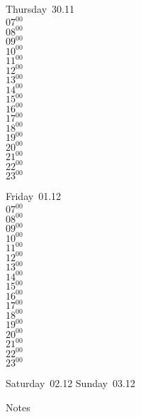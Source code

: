 \documentclass[11pt, a4paper]{book}\usepackage[]{graphicx}\usepackage[]{color}
\begin{document}
\begin{weekdaybox}
  Thursday~30.11\\
  { 
  \vfill
  $07^{00}$\\
$08^{00}$\\
$09^{00}$\\
$10^{00}$\\
$11^{00}$\\
$12^{00}$\\
$13^{00}$\\
$14^{00}$\\
$15^{00}$\\
$16^{00}$\\
$17^{00}$\\
$18^{00}$\\
$19^{00}$\\
$20^{00}$\\
$21^{00}$\\
$22^{00}$\\
$23^{00}$\\
  }
\end{weekdaybox} 
\begin{weekdaybox}
  Friday~01.12\\
  { 
  \vfill
  $07^{00}$\\
$08^{00}$\\
$09^{00}$\\
$10^{00}$\\
$11^{00}$\\
$12^{00}$\\
$13^{00}$\\
$14^{00}$\\
$15^{00}$\\
$16^{00}$\\
$17^{00}$\\
$18^{00}$\\
$19^{00}$\\
$20^{00}$\\
$21^{00}$\\
$22^{00}$\\
$23^{00}$\\
  }
\end{weekdaybox}
\begin{weekendbox}
  Saturday~02.12
  \tcblower
  Sunday~03.12
\end{weekendbox} %
\begin{notebox}
  Notes
\end{notebox}
\clearpage
\end{document}
